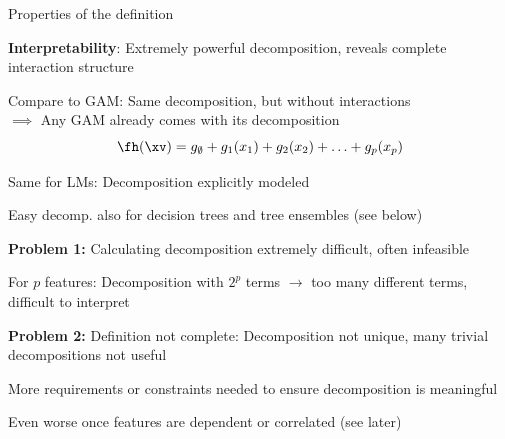 \documentclass[10pt,compress,t,notes=noshow, xcolor=table]{beamer}
\begin{document}

\begin{framev}[align=top]{Properties of the definition}
\begin{itemizeM}
\item \textbf{Interpretability}: Extremely powerful decomposition, reveals complete interaction structure
\pause
\item Compare to GAM: Same decomposition, but without interactions \\
$\implies$ Any GAM already comes with its decomposition
$$
\fh (\xv) = g_\emptyset + g_1(x_1) + g_2(x_2) + \ldots + g_p(x_p)
$$
\item Same for LMs: Decomposition explicitly modeled
\pause
\item Easy decomp. also for decision trees and tree ensembles (see below)
\pause
\item \textbf{Problem 1:} Calculating decomposition extremely difficult, often infeasible
\begin{itemizeS}
\item For \(p\) features: Decomposition with \(2^p\) terms \(\rightarrow\) too many different terms, difficult to interpret
\end{itemizeS}
\pause
\item \textbf{Problem 2:} Definition not complete: Decomposition not unique, many trivial decompositions not useful
\begin{itemizeS}
\item[$\rightarrow$] More requirements or constraints needed to ensure decomposition is meaningful
\item Even worse once features are dependent or correlated (see later)
\end{itemizeS}


\end{itemizeM}
\end{framev}
\end{document}
